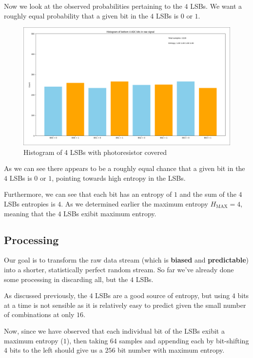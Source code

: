\newpage
Now we look at the observed probabilities pertaining to 
the \(4\) LSBs. We want a roughly equal probability that a given 
bit in the \(4\) LSBs is \(0\) or \(1\).

\begin{figure}[h]
    \centering
    \includegraphics[width=0.9\linewidth]{./images/HISTOGRAM_WITH_ENTROPY.png} 
    \caption{Histogram of 4 LSBs with photoresistor covered}
    \label{fig:histogram_LSB_covered}
\end{figure}

As we can see there appears to be a roughly equal chance that a 
given bit in the \(4\) LSBs is \(0\) or \(1\), pointing towards 
high entropy in the LSBs.

Furthermore, we can see that each bit has an entropy of \(1\)
and the sum of the \(4\) LSBs entropies is \(4\). 
As we determined earlier the maximum entropy \(H_{\text{MAX}} = 4\), 
meaning that the \(4\) LSBs exibit maximum entropy.
 
\subsection{Processing}
Our goal is to transform the raw data stream 
(which is \textbf{biased} and \textbf{predictable}) into a shorter, 
statistically perfect random stream.
So far we've already done some processing in discarding all, but 
the \(4\) LSBs. 

As discussed previously, the \(4\) LSBs are a good source of entropy, 
but using \(4\) bits at a time is not sensible as it 
is relatively easy to predict given the small number of combinations 
at only \(16\).

Now, since we have observed that each individual bit of the 
LSBs exibit a maximum entropy (\(1\)), then taking 
\(64\) samples and appending each by bit-shifting 
\(4\) bits to the left should give us a 
\(256\) bit number with maximum entropy.


